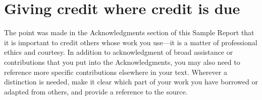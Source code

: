 \chapter{Giving credit where credit is due}\label{Ch:GivingCredit}

The point was made in the Acknowledgments section of this Sample Report that it is important to credit others whose work you use---it is a matter of professional ethics and courtesy. 
In addition to acknowledgment of broad assistance or contributions that you put into the Acknowledgments, you may also need to reference more specific contributions elsewhere in your text.
Wherever a distinction is needed, make it clear which part of your work you have borrowed or adapted from others, and provide a reference to the source. 


\endinput

